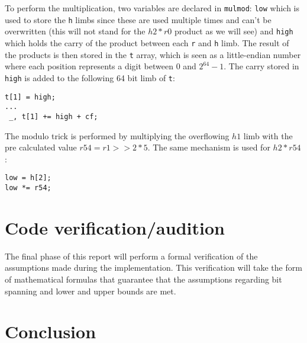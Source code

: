 \documentclass[twocolumn]{article}
\begin{document}
To perform the multiplication, two variables are declared in \texttt{mulmod}: \texttt{low} which is used to store the \texttt{h} limbs since these are used multiple
times and can't be overwritten (this will not stand for the $h2*r0$ product as we will see) and \texttt{high} which holds the carry of the product between 
each \texttt{r} and \texttt{h} limb. The result of the products is then stored in the \texttt{t} array, which is seen as a little-endian number where each position
represents a digit between $0$ and $2^{64}-1$. The carry stored in \texttt{high} is added to the following 64 bit limb of \texttt{t}:
\begin{verbatim}
t[1] = high;
...
 _, t[1] += high + cf;
\end{verbatim}
The modulo trick is performed by multiplying the overflowing $h1$ limb with the pre calculated value $r54=r1>>2*5$. The same mechanism is used for $h2*r54$:
\begin{verbatim}
low = h[2];
low *= r54;
\end{verbatim}



\section{Code verification/audition}
The final phase of this report will perform a formal verification of the assumptions made during the implementation. This verification will take the form of
mathematical formulas that guarantee that the assumptions regarding bit spanning and lower and upper bounds are met.

\section{Conclusion}

\printbibliography

\onecolumn
\begin{appendices}
\end{appendices}
\end{document}

